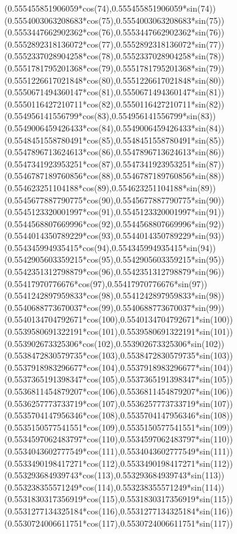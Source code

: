 {({0.555455851906059*cos(74)},{0.555455851906059*sin(74)})
({0.5554003063208683*cos(75)},{0.5554003063208683*sin(75)})
({0.5553447662902362*cos(76)},{0.5553447662902362*sin(76)})
({0.5552892318136072*cos(77)},{0.5552892318136072*sin(77)})
({0.5552337028904258*cos(78)},{0.5552337028904258*sin(78)})
({0.5551781795201368*cos(79)},{0.5551781795201368*sin(79)})
({0.5551226617021848*cos(80)},{0.5551226617021848*sin(80)})
({0.5550671494360147*cos(81)},{0.5550671494360147*sin(81)})
({0.5550116427210711*cos(82)},{0.5550116427210711*sin(82)})
({0.554956141556799*cos(83)},{0.554956141556799*sin(83)})
({0.5549006459426433*cos(84)},{0.5549006459426433*sin(84)})
({0.5548451558780491*cos(85)},{0.5548451558780491*sin(85)})
({0.5547896713624613*cos(86)},{0.5547896713624613*sin(86)})
({0.5547341923953251*cos(87)},{0.5547341923953251*sin(87)})
({0.5546787189760856*cos(88)},{0.5546787189760856*sin(88)})
({0.554623251104188*cos(89)},{0.554623251104188*sin(89)})
({0.5545677887790775*cos(90)},{0.5545677887790775*sin(90)})
({0.5545123320001997*cos(91)},{0.5545123320001997*sin(91)})
({0.5544568807669996*cos(92)},{0.5544568807669996*sin(92)})
({0.5544014350789229*cos(93)},{0.5544014350789229*sin(93)})
({0.554345994935415*cos(94)},{0.554345994935415*sin(94)})
({0.5542905603359215*cos(95)},{0.5542905603359215*sin(95)})
({0.5542351312798879*cos(96)},{0.5542351312798879*sin(96)})
({0.55417970776676*cos(97)},{0.55417970776676*sin(97)})
({0.5541242897959833*cos(98)},{0.5541242897959833*sin(98)})
({0.5540688773670037*cos(99)},{0.5540688773670037*sin(99)})
({0.5540134704792671*cos(100)},{0.5540134704792671*sin(100)})
({0.5539580691322191*cos(101)},{0.5539580691322191*sin(101)})
({0.553902673325306*cos(102)},{0.553902673325306*sin(102)})
({0.5538472830579735*cos(103)},{0.5538472830579735*sin(103)})
({0.5537918983296677*cos(104)},{0.5537918983296677*sin(104)})
({0.5537365191398347*cos(105)},{0.5537365191398347*sin(105)})
({0.5536811454879207*cos(106)},{0.5536811454879207*sin(106)})
({0.5536257773733719*cos(107)},{0.5536257773733719*sin(107)})
({0.5535704147956346*cos(108)},{0.5535704147956346*sin(108)})
({0.5535150577541551*cos(109)},{0.5535150577541551*sin(109)})
({0.5534597062483797*cos(110)},{0.5534597062483797*sin(110)})
({0.5534043602777549*cos(111)},{0.5534043602777549*sin(111)})
({0.5533490198417271*cos(112)},{0.5533490198417271*sin(112)})
({0.553293684939743*cos(113)},{0.553293684939743*sin(113)})
({0.553238355571249*cos(114)},{0.553238355571249*sin(114)})
({0.5531830317356919*cos(115)},{0.5531830317356919*sin(115)})
({0.5531277134325184*cos(116)},{0.5531277134325184*sin(116)})
({0.5530724006611751*cos(117)},{0.5530724006611751*sin(117)})
}
